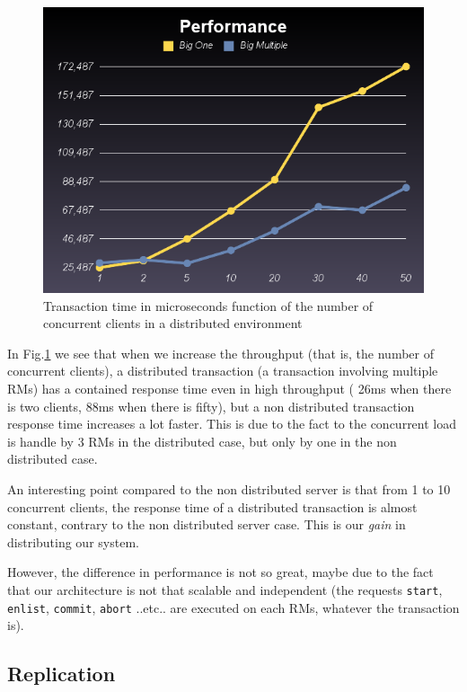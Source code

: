 \documentclass[a4paper]{article}
\begin{document}
\begin{figure}[ht!]
  \centering
	\includegraphics[scale=0.5]{distributed.png}
  \caption{Transaction time in microseconds function of the number of concurrent clients in a distributed environment}
  \label{oneclient}
\end{figure}

In Fig.\ref{oneclient} we see that when we increase the throughput (that is, the number of concurrent clients), a distributed transaction (a transaction involving multiple RMs) has a contained response time even in high throughput ( 26ms when there is two clients, 88ms when there is fifty), but a non distributed transaction response time increases a lot faster. This is due to the fact to the concurrent load is handle by 3 RMs in the distributed case, but only by one in the non distributed case.

An interesting point compared to the non distributed server is that from 1 to 10 concurrent clients, the response time of a distributed transaction is almost constant, contrary to the non distributed server case. This is our \emph{gain} in distributing our system.

However, the difference in performance is not so great, maybe due to the fact that our architecture is not that scalable and independent (the requests \texttt{start}, \texttt{enlist}, \texttt{commit}, \texttt{abort} ..etc.. are executed on each RMs, whatever the transaction is).

\subsection{Replication}
\end{document}

